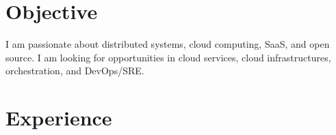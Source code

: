 \documentclass[]{cv-style}                     %
\begin{document}

\section{Objective}

I am passionate about distributed systems, cloud computing, SaaS, and open source.
I am looking for opportunities in cloud services, cloud infrastructures, orchestration, and DevOps/SRE.



\section{Experience}
\end{document}
